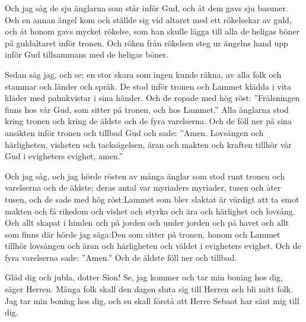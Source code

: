 
Och jag såg de sju änglarna som står inför Gud, och åt dem gavs sju basuner.
Och en annan ängel kom och ställde sig vid altaret med ett rökelsekar av guld, och åt honom gavs mycket rökelse, som han skulle lägga till alla de heligas böner på guldaltaret inför tronen.
Och röken från rökelsen steg ur ängelns hand upp inför Gud tillsammans med de heligas böner.



Sedan såg jag, och se: en stor skara som ingen kunde räkna, av alla folk och stammar och länder och språk. De stod inför tronen och Lammet klädda i vita kläder med palmkvistar i sina händer.
Och de ropade med hög röst: ”Frälsningen finns hos vår Gud, som sitter på tronen, och hos Lammet.”
Alla änglarna stod kring tronen och kring de äldste och de fyra varelserna. Och de föll ner på sina ansikten inför tronen och tillbad Gud
och sade: ”Amen. Lovsången och härligheten, visheten och tacksägelsen, äran och makten och kraften tillhör vår Gud i evigheters evighet, amen.”



Och jag såg, och jag hörde rösten av många änglar som stod runt tronen och varelserna och de äldste; deras antal var myriaders myriader, tusen och åter tusen,
och de sade med hög röst:Lammet som blev slaktat är värdigt att ta emot makten och få rikedom och vishet och styrka och ära och härlighet och lovsång.
Och allt skapat i himlen och på jorden och under jorden och på havet och allt som finns där hörde jag säga:Den som sitter på tronen, honom och Lammet tillhör lovsången och äran och härligheten och väldet i evigheters evighet.
Och de fyra varelserna sade: ”Amen.” Och de äldste föll ner och tillbad.



Gläd dig och jubla, dotter Sion!
Se, jag kommer
och tar min boning hos dig,
säger Herren.
Många folk skall den dagen
sluta sig till Herren och bli mitt folk.
Jag tar min boning hos dig, och su skall förstå att Herre Sebaot har sänt mig till dig.

\newpage
{} 


